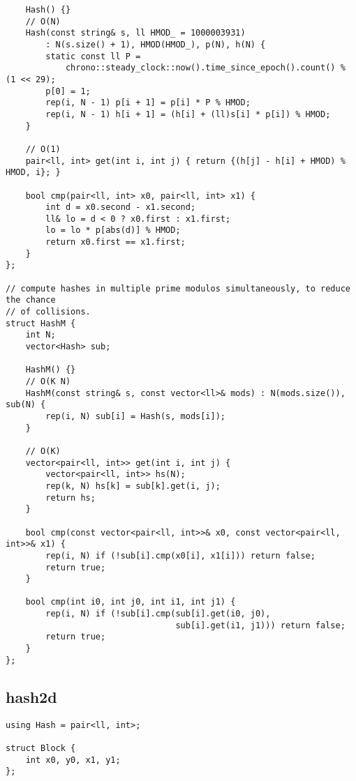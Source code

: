 \documentclass[twoside]{article}
\begin{document}
\begin{multicols*}{2}
\begin{verbatim}
    Hash() {}
    // O(N)
    Hash(const string& s, ll HMOD_ = 1000003931)
        : N(s.size() + 1), HMOD(HMOD_), p(N), h(N) {
        static const ll P =
            chrono::steady_clock::now().time_since_epoch().count() % (1 << 29);
        p[0] = 1;
        rep(i, N - 1) p[i + 1] = p[i] * P % HMOD;
        rep(i, N - 1) h[i + 1] = (h[i] + (ll)s[i] * p[i]) % HMOD;
    }

    // O(1)
    pair<ll, int> get(int i, int j) { return {(h[j] - h[i] + HMOD) % HMOD, i}; }

    bool cmp(pair<ll, int> x0, pair<ll, int> x1) {
        int d = x0.second - x1.second;
        ll& lo = d < 0 ? x0.first : x1.first;
        lo = lo * p[abs(d)] % HMOD;
        return x0.first == x1.first;
    }
};

// compute hashes in multiple prime modulos simultaneously, to reduce the chance
// of collisions.
struct HashM {
    int N;
    vector<Hash> sub;

    HashM() {}
    // O(K N)
    HashM(const string& s, const vector<ll>& mods) : N(mods.size()), sub(N) {
        rep(i, N) sub[i] = Hash(s, mods[i]);
    }

    // O(K)
    vector<pair<ll, int>> get(int i, int j) {
        vector<pair<ll, int>> hs(N);
        rep(k, N) hs[k] = sub[k].get(i, j);
        return hs;
    }

    bool cmp(const vector<pair<ll, int>>& x0, const vector<pair<ll, int>>& x1) {
        rep(i, N) if (!sub[i].cmp(x0[i], x1[i])) return false;
        return true;
    }

    bool cmp(int i0, int j0, int i1, int j1) {
        rep(i, N) if (!sub[i].cmp(sub[i].get(i0, j0),
                                  sub[i].get(i1, j1))) return false;
        return true;
    }
};
\end{verbatim}

{
\subsection*{hash2d}
}
\begin{verbatim}
using Hash = pair<ll, int>;

struct Block {
    int x0, y0, x1, y1;
};


\end{verbatim}
\end{multicols*}
\end{document}
